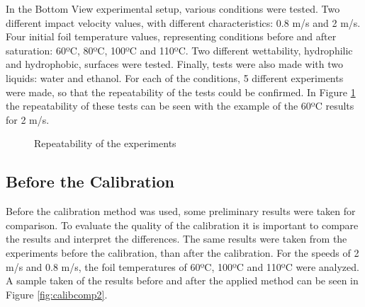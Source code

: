 \par In the Bottom View experimental setup, various conditions were tested. Two different impact velocity values, with different characteristics: 0.8 m/s and 2 m/s. Four initial foil temperature values, representing conditions before and after saturation: 60ºC, 80ºC, 100ºC and 110ºC. Two different wettability, hydrophilic and hydrophobic, surfaces were tested. Finally, tests were also made with two liquids: water and ethanol. For each of the conditions, 5 different experiments were made, so that the repeatability of the tests could be confirmed. In Figure \ref{fig:repeat} the repeatability of these tests can be seen with the example of the 60ºC results for 2 m/s.\\

\begin{figure}
\centering

\caption{Repeatability of the experiments}
\label{fig:repeat}
\end{figure}

\subsection{Before the Calibration}

\par Before the calibration method was used, some preliminary results were taken for comparison. To evaluate the quality of the calibration it is important to compare the results and interpret the differences. The same results were taken from the experiments before the calibration, than after the calibration. For the speeds of 2 m/s and 0.8 m/s, the foil temperatures of 60ºC, 100ºC and 110ºC were analyzed. A sample taken of the results before and after the applied method can be seen in Figure \ref{fig:calibcomp2}. \\


